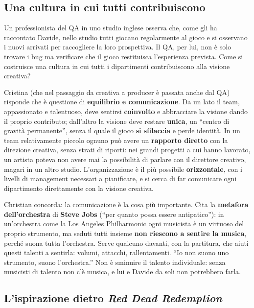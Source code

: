 \subsection{Una cultura in cui tutti contribuiscono}

Un professionista del QA in uno studio inglese osserva che, come gli ha raccontato
Davide, nello studio tutti giocano regolarmente al gioco e si osservano i nuovi
arrivati per raccogliere la loro prospettiva. Il QA, per lui, non è solo trovare i
bug ma verificare che il gioco restituisca l'esperienza prevista. Come si costruisce
una cultura in cui tutti i dipartimenti contribuiscono alla visione creativa?

Cristina (che nel passaggio da creativa a producer è passata anche dal QA) risponde
che è questione di \textbf{equilibrio e comunicazione}. Da un lato il team,
appassionato e talentuoso, deve sentirsi \textbf{coinvolto} e abbracciare la visione
dando il proprio contributo; dall'altro la visione deve restare \textbf{unica}, un
``centro di gravità permanente'', senza il quale il gioco \textbf{si sfilaccia} e
perde identità. In un team relativamente piccolo ognuno può avere un
\textbf{rapporto diretto} con la direzione creativa, senza strati di riporti: nei
grandi progetti a cui hanno lavorato, un artista poteva non avere mai la possibilità
di parlare con il direttore creativo, magari in un altro studio. L'organizzazione è
il più possibile \textbf{orizzontale}, con i livelli di management necessari a
pianificare, e si cerca di far comunicare ogni dipartimento direttamente con la
visione creativa.

Christian concorda: la comunicazione è la cosa più importante. Cita la
\textbf{metafora dell'orchestra} di \textbf{Steve Jobs} (``per quanto possa essere
antipatico''): in un'orchestra come la Los Angeles Philharmonic ogni musicista è un
virtuoso del proprio strumento, ma seduti tutti insieme \textbf{non riescono a
sentire la musica}, perché suona tutta l'orchestra. Serve qualcuno davanti, con la
partitura, che aiuti questi talenti a sentirla: volumi, attacchi, rallentamenti.
``Io non suono uno strumento, suono l'orchestra.'' Non è sminuire il talento
individuale: senza musicisti di talento non c'è musica, e lui e Davide da soli non
potrebbero farla.

\subsection{L'ispirazione dietro \emph{Red Dead Redemption}}

